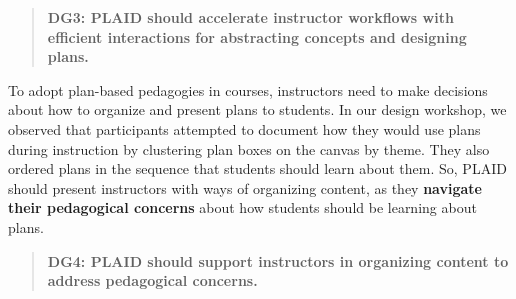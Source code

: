\begin{quote}


    \textbf{DG3: PLAID should accelerate instructor workflows with efficient interactions for abstracting concepts and designing plans.}



\end{quote}




To adopt plan-based pedagogies in courses, instructors need to make decisions about how to organize and present plans to students. 
In our design workshop,
we observed that participants attempted to document how they would use plans during instruction by clustering plan boxes on the canvas by theme. They also ordered plans in the sequence that students should learn about them.
So, PLAID should present instructors with ways of organizing content, as they \textbf{navigate their pedagogical concerns} about how students should be learning about plans.

\begin{quote}
    \textbf{DG4: PLAID should support instructors in organizing content to address pedagogical concerns.
    } %
\end{quote}






